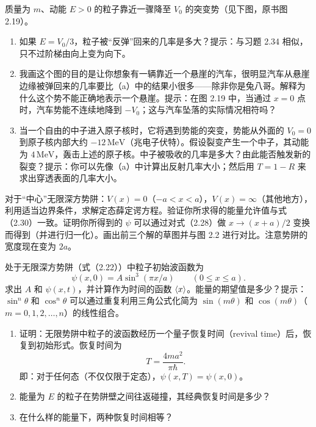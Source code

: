 质量为 $m$、动能 $E>0$ 的粒子靠近一骤降至 $V_0$ 的突变势（见下图，原书图 2.19）。
\begin{center}

\par{}
\end{center}
\begin{enumerate}
\item 如果 $E=V_0/3$，粒子被“反弹”回来的几率是多大？提示：与习题 2.34 相似，只不过阶梯由向上变为向下。
\item 我画这个图的目的是让你想象有一辆靠近一个悬崖的汽车，很明显汽车从悬崖边缘被弹回来的几率要比（a）中的结果小很多——除非你是兔八哥。解释为什么这个势不能正确地表示一个悬崖。提示：在图 2.19 中，当通过 $x=0$ 点时，汽车势能不连续地降到 $-V_0$；这与汽车坠落的实际情况相符吗？
\item 当一个自由的中子进入原子核时，它将遇到势能的突变，势能从外面的 $V_0=0$ 到原子核内部大约 $-12\,\mathrm{MeV}$（兆电子伏特）。假设裂变产生一个中子，其动能为 $4\,\mathrm{MeV}$，轰击上述的原子核。中子被吸收的几率是多大？由此能否触发新的裂变？提示：你可以先像（a）中计算出反射几率大小；然后用 $T=1-R$ 来求出穿透表面的几率大小。
\end{enumerate}
\vfill

对于“中心”无限深方势阱：$V(x)=0$（$-a<x<a$），$V(x)=\infty$（其他地方），利用适当边界条件，求解定态薛定谔方程。验证你所求得的能量允许值与式（2.30）一致。证明你所得到的 $\psi$ 可以通过对式（2.28）做 $x\to(x+a)/2$ 变换而得到（并进行归一化）。画出前三个解的草图并与图 2.2 进行对比。注意势阱的宽度现在变为 $2a$。
\vfill

处于无限深方势阱（式（2.22））中粒子初始波函数为
\[
\psi(x,0)=A\sin^3(\pi x/a)\qquad(0\leq x\leq a).
\]
求出 $A$ 和 $\psi(x,t)$，并计算作为时间的函数 $\left\langle x\right\rangle$。能量的期望值是多少？提示：$\sin^n\theta$ 和 $\cos^n\theta$ 可以通过重复利用三角公式化简为 $\sin(m\theta)$ 和 $\cos(m\theta)$（$m=0,1,2,\ldots,n$）的线性组合。
\vfill

\begin{enumerate}
\item 证明：无限势阱中粒子的波函数经历一个量子恢复时间（revival time）后，恢复到初始形式。恢复时间为
\[
T=\frac{4ma^2}{\pi\hbar}.
\]
即：对于任何态（不仅仅限于定态），$\psi(x,T)=\psi(x,0)$。
\item 能量为 $E$ 的粒子在势阱壁之间往返碰撞，其经典恢复时间是多少？
\item 在什么样的能量下，两种恢复时间相等？
\end{enumerate}
\vfill

